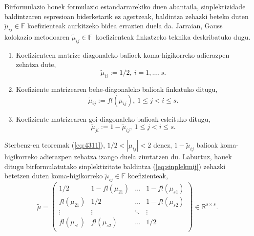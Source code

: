 Birformulazio honek formulazio estandarrarekiko duen abantaila,  sinplektizidade baldintzaren espresioan biderketarik ez agertzeak, baldintza zehazki beteko duten $\tilde \mu_{ij} \in \mathbb{F}$ koefizienteak aurkitzeko bidea errazten duela da. Jarraian, Gauss kolokazio metodoaren $\tilde{\mu}_{ij} \in \mathbb{F}$~koefizienteak finkatzeko teknika deskribatuko dugu.
\begin{enumerate}
\item Koefizienteen matrize diagonaleko balioek koma-higikorreko adierazpen zehatza dute,
\begin{equation*}
\tilde{\mu}_{ii}:=1/2, \ i=1,\dots,s.
\end{equation*}

\item Koefiziente matrizearen behe-diagonaleko balioak finkatuko ditugu,
\begin{equation*}
 \tilde{\mu}_{ij}:=fl(\mu_{ij}), \ 1 \leqslant j < i \leqslant s.
\end{equation*}

\item Koefiziente matrizearen goi-diagonaleko balioak esleituko ditugu,
\begin{equation*}
\tilde{\mu}_{ji}:=1-\tilde{\mu}_{ij} , \ 1 \leqslant j < i \leqslant s.
\end{equation*}

\end{enumerate}
Sterbenz-en teoremak (\ref{eq:4311}), $1/2 < |\mu_{ij}| <2$ denez, $1-\tilde{\mu}_{ij}$ balioak koma-higikorreko adierazpen zehatza izango duela ziurtatzen du. Laburtuz, hauek ditugu birformulatutako sinplektizitate baldintza (\ref{eq:sinplekmij}) zehazki betetzen duten koma-higikorreko $\tilde{\mu}_{ij}\in \mathbb{F}$ koefizienteak,   
\begin{equation}
\tilde{\mu}=\left(\begin{array}{cccc}
    1/2       & 1-fl(\mu_{21}) & \dots & 1-fl(\mu_{s1})      \\
    fl(\mu_{21})      & 1/2    & \dots & 1-fl(\mu_{s2})      \\
    \vdots            & \vdots         & \ddots      & \vdots      \\
    fl(\mu_{s1})      & fl(\mu_{s2})   & \dots & 1/2          \\ 
     \end{array}\right) \in \mathbb{R}^{s \times s}.
\end{equation}

